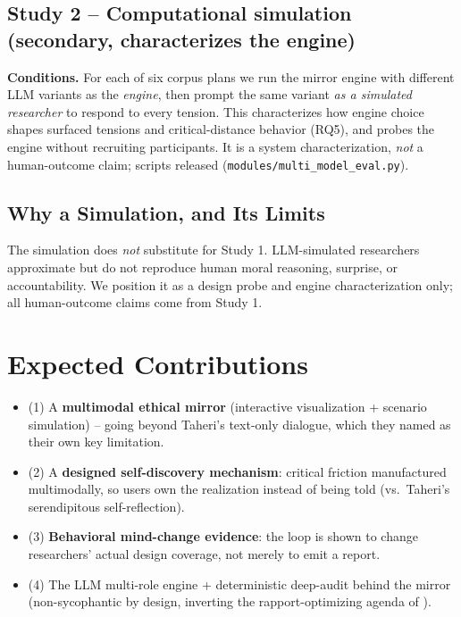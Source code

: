 \documentclass[manuscript,screen]{acmart}
\begin{document}
\subsection{Study 2 -- Computational simulation (secondary, characterizes the engine)}
\label{sec:sim}
\noindent\textbf{Conditions.} For each of six corpus plans we run the mirror engine with
different LLM variants as the \emph{engine}, then prompt the same variant \emph{as a
simulated researcher} to respond to every tension. This characterizes how engine choice
shapes surfaced tensions and critical-distance behavior (RQ5), and probes the engine
without recruiting participants. It is a system characterization, \emph{not} a
human-outcome claim; scripts released (\texttt{modules/multi\_model\_eval.py}).

\subsection{Why a Simulation, and Its Limits}
\label{sec:whysim}
The simulation does \emph{not} substitute for Study 1. LLM-simulated researchers
approximate but do not reproduce human moral reasoning, surprise, or accountability.
We position it as a design probe and engine characterization only; all human-outcome
claims come from Study 1.

\section{Expected Contributions}
\begin{itemize}
  \item (1) A \textbf{multimodal ethical mirror} (interactive visualization +
    scenario simulation) -- going beyond Taheri's text-only dialogue, which they named
    as their own key limitation.
  \item (2) A \textbf{designed self-discovery mechanism}: critical friction manufactured
    multimodally, so users own the realization instead of being told (vs.\ Taheri's
    serendipitous self-reflection).
  \item (3) \textbf{Behavioral mind-change evidence}: the loop is shown to change
    researchers' actual design coverage, not merely to emit a report.
  \item (4) The LLM multi-role engine + deterministic deep-audit behind the mirror
    (non-sycophantic by design, inverting the rapport-optimizing agenda of
    \citep{vibecheck26,recallbot26,hearinsilence26,perspectra26}).
\end{itemize}
\end{document}

